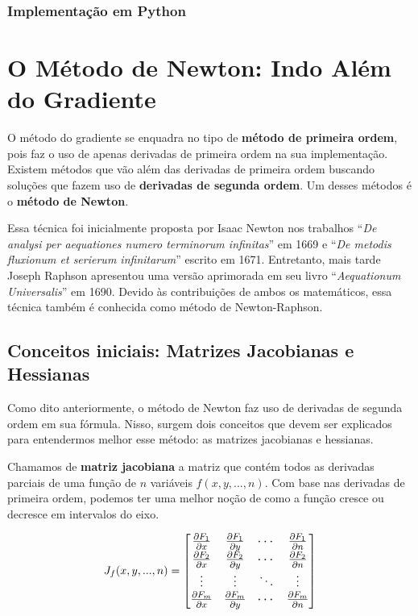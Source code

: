 \subsubsection{Implementação em Python}


\section{O Método de Newton: Indo Além do Gradiente}

O método do gradiente se enquadra no tipo de \textbf{método de primeira ordem}, pois faz o uso de apenas derivadas de primeira ordem na sua implementação. Existem métodos que vão além das derivadas de primeira ordem buscando soluções que fazem uso de \textbf{derivadas de segunda ordem}. Um desses métodos é o \textbf{método de Newton}.

Essa técnica foi inicialmente proposta por Isaac Newton nos trabalhos “\textit{De analysi per aequationes numero terminorum infinitas}” em 1669 e “\textit{De metodis fluxionum et serierum infinitarum}” escrito em 1671. Entretanto, mais tarde Joseph Raphson apresentou uma versão aprimorada em seu livro “\textit{Aequationum Universalis}” em 1690. Devido às contribuições de ambos os matemáticos, essa técnica também é conhecida como método de Newton-Raphson.

\subsection{Conceitos iniciais: Matrizes Jacobianas e Hessianas}

Como dito anteriormente, o método de Newton faz uso de derivadas de segunda ordem em sua fórmula. Nisso, surgem dois conceitos que devem ser explicados para entendermos melhor esse método: as matrizes jacobianas e hessianas.

Chamamos de \textbf{matriz jacobiana} a matriz que contém todos as derivadas parciais de uma função de $n$ variáveis $f(x, y, ..., n)$. Com base nas derivadas de primeira ordem, podemos ter uma melhor noção de como a função cresce ou decresce em intervalos do eixo.

    \begin{equation}
        \large J_f(x,y,...,n) =
        \begin{bmatrix}
        \frac{\partial F_1}{\partial x} & \frac{\partial F_1}{\partial y} & \cdots & \frac{\partial F_1}{\partial n} \\
        \frac{\partial F_2}{\partial x} & \frac{\partial F_2}{\partial y} & \cdots & \frac{\partial F_2}{\partial n} \\
        \vdots & \vdots & \ddots & \vdots \\
        \frac{\partial F_m}{\partial x} & \frac{\partial F_m}{\partial y} & \cdots & \frac{\partial F_m}{\partial n}
        \end{bmatrix}
    \end{equation}

